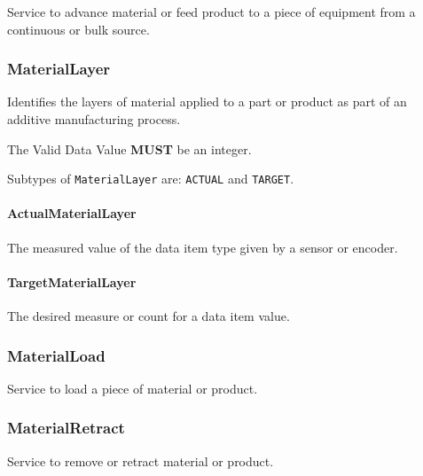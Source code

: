 Service to advance material or feed product to a piece of equipment from a continuous or bulk source.

\FloatBarrier

\subsubsection{MaterialLayer}
\label{sec:MaterialLayer}



Identifies the layers of material applied to a part or product as part of an additive manufacturing process.
  
 The \gls{Valid Data Value} \textbf{MUST} be an integer.


Subtypes of \texttt{MaterialLayer} are: \texttt{ACTUAL} and \texttt{TARGET}. 
\FloatBarrier

\paragraph{ActualMaterialLayer}\mbox{}
\label{sec:ActualMaterialLayer}



The measured value of the data item type given by a sensor or encoder.


\paragraph{TargetMaterialLayer}\mbox{}
\label{sec:TargetMaterialLayer}



The desired measure or count for a data item value.


\subsubsection{MaterialLoad}
\label{sec:MaterialLoad}



Service to load a piece of material or product.

\FloatBarrier

\subsubsection{MaterialRetract}
\label{sec:MaterialRetract}



Service to remove or retract material or product.

\FloatBarrier

